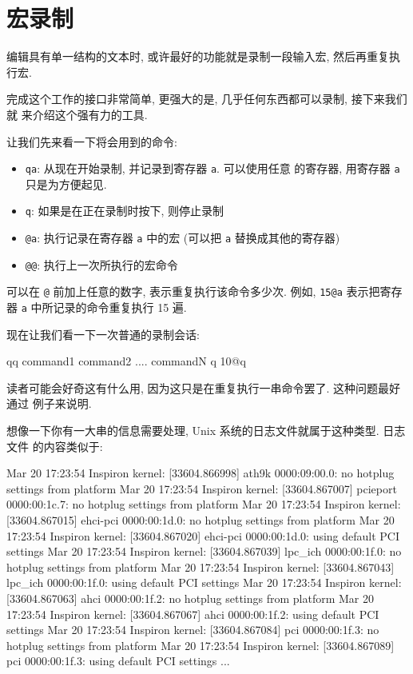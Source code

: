\section{宏录制}
\label{sec:using_macro_recording}

编辑具有单一结构的文本时, 或许最好的功能就是录制一段输入宏, 然后再重复执行宏.

完成这个工作的接口非常简单, 更强大的是, 几乎任何东西都可以录制, 接下来我们就
来介绍这个强有力的工具.

让我们先来看一下将会用到的命令:
\begin{itemize}
    \item \texttt{qa}: 从现在开始录制, 并记录到寄存器 \texttt{a}. 可以使用任意
        的寄存器, 用寄存器 \texttt{a} 只是为方便起见.
    \item \texttt{q}: 如果是在正在录制时按下, 则停止录制
    \item \texttt{@a}: 执行记录在寄存器 \texttt{a} 中的宏 (可以把 \texttt{a}
        替换成其他的寄存器)
    \item \texttt{@@}: 执行上一次所执行的宏命令
\end{itemize}
可以在 \texttt{@} 前加上任意的数字, 表示重复执行该命令多少次. 例如,
\texttt{15@a} 表示把寄存器 \texttt{a} 中所记录的命令重复执行 15 遍.

现在让我们看一下一次普通的录制会话:
\begin{vimcode}
qq
command1
command2
....
commandN
q
10@q
\end{vimcode}
读者可能会好奇这有什么用, 因为这只是在重复执行一串命令罢了. 这种问题最好通过
例子来说明.

想像一下你有一大串的信息需要处理, Unix 系统的日志文件就属于这种类型. 日志文件
的内容类似于:
\begin{vimcode}
Mar 20 17:23:54 Inspiron kernel: [33604.866998] ath9k 0000:09:00.0: no hotplug settings from platform
Mar 20 17:23:54 Inspiron kernel: [33604.867007] pcieport 0000:00:1c.7: no hotplug settings from platform
Mar 20 17:23:54 Inspiron kernel: [33604.867015] ehci-pci 0000:00:1d.0: no hotplug settings from platform
Mar 20 17:23:54 Inspiron kernel: [33604.867020] ehci-pci 0000:00:1d.0: using default PCI settings
Mar 20 17:23:54 Inspiron kernel: [33604.867039] lpc_ich 0000:00:1f.0: no hotplug settings from platform
Mar 20 17:23:54 Inspiron kernel: [33604.867043] lpc_ich 0000:00:1f.0: using default PCI settings
Mar 20 17:23:54 Inspiron kernel: [33604.867063] ahci 0000:00:1f.2: no hotplug settings from platform
Mar 20 17:23:54 Inspiron kernel: [33604.867067] ahci 0000:00:1f.2: using default PCI settings
Mar 20 17:23:54 Inspiron kernel: [33604.867084] pci 0000:00:1f.3: no hotplug settings from platform
Mar 20 17:23:54 Inspiron kernel: [33604.867089] pci 0000:00:1f.3: using default PCI settings
...
\end{vimcode}
